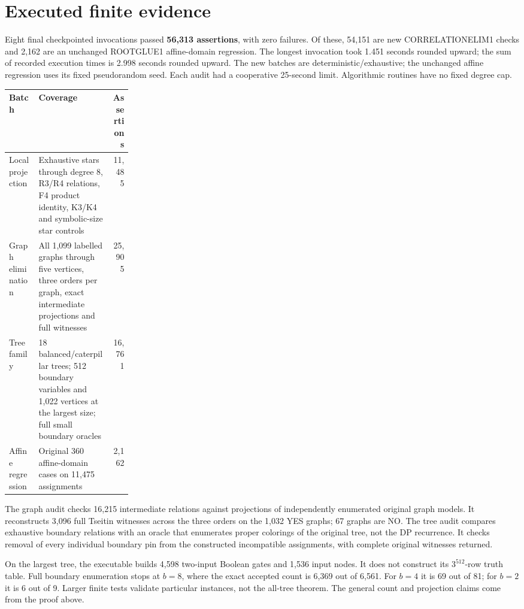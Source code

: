 \documentclass[11pt]{article}
\begin{document}
\section{Executed finite evidence}
Eight final checkpointed invocations passed \textbf{56,313 assertions}, with
zero failures. Of these, 54,151 are new CORRELATIONELIM1 checks and 2,162 are
an unchanged ROOTGLUE1 affine-domain regression. The longest invocation took
1.451 seconds rounded upward; the sum of recorded execution times is 2.998
seconds rounded upward. The new batches are deterministic/exhaustive; the
unchanged affine regression uses its fixed pseudorandom seed. Each audit had
a cooperative 25-second limit. Algorithmic routines have no fixed degree cap.
\begin{center}\small
\begin{tabularx}{\linewidth}{p{0.24\linewidth}Xr}
\toprule
Batch & Coverage & Assertions\\\midrule
Local projection & Exhaustive stars through degree 8, R3/R4 relations,
F4 product identity, K3/K4 and symbolic-size star controls & 11,485\\
Graph elimination & All 1,099 labelled graphs through five vertices, three
orders per graph, exact intermediate projections and full witnesses & 25,905\\
Tree family & 18 balanced/caterpillar trees; 512 boundary variables and
1,022 vertices at the largest size; full small boundary oracles & 16,761\\
Affine regression & Original 360 affine-domain cases on 11,475 assignments & 2,162\\
\bottomrule
\end{tabularx}\end{center}

The graph audit checks 16,215 intermediate relations against projections of
independently enumerated original graph models. It reconstructs 3,096 full
Tseitin witnesses across the three orders on the 1,032 YES graphs; 67 graphs
are NO. The tree audit compares exhaustive boundary relations with an oracle
that enumerates proper colorings of the original tree, not the DP recurrence.
It checks removal of every individual boundary pin from the constructed
incompatible assignments, with complete original witnesses returned.

On the largest tree, the executable builds 4,598 two-input Boolean gates and
1,536 input nodes. It does not construct its $3^{512}$-row truth table.
Full boundary enumeration stops at $b=8$, where the exact accepted count is
6,369 out of 6,561. For $b=4$ it is 69 out of 81; for $b=2$ it is 6 out of 9.
Larger finite tests validate particular instances, not the all-tree theorem.
The general count and projection claims come from the proof above.
\end{document}
